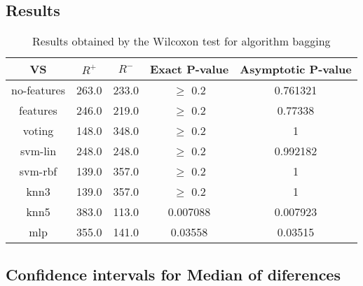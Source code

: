 \documentclass[a4paper,10pt]{article}
\begin{document}
\subsection{Results}

\begin{table}[!htp]
\centering\small
\begin{tabular}{
|c|c|c|c|c|}
\hline
 VS & $R^{+}$ & $R^{-}$ & Exact P-value & Asymptotic P-value \\ \hline 
no-features & 263.0 & 233.0 & $\geq$ 0.2 & 0.761321\\ \hline 
features & 246.0 & 219.0 & $\geq$ 0.2 & 0.77338\\ \hline 
voting & 148.0 & 348.0 & $\geq$ 0.2 & 1\\ \hline 
svm-lin & 248.0 & 248.0 & $\geq$ 0.2 & 0.992182\\ \hline 
svm-rbf & 139.0 & 357.0 & $\geq$ 0.2 & 1\\ \hline 
knn3 & 139.0 & 357.0 & $\geq$ 0.2 & 1\\ \hline 
knn5 & 383.0 & 113.0 & 0.007088 & 0.007923\\ \hline 
mlp & 355.0 & 141.0 & 0.03558 & 0.03515\\ \hline 

\end{tabular}
\caption{Results obtained by the Wilcoxon test for algorithm bagging}
\end{table}

\subsection{Confidence intervals for Median of diferences}
\end{document}
